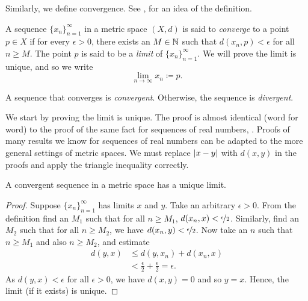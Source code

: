 Similarly, we define convergence.
See , for an idea of
the definition.

\begin{defn}
A sequence $\{ x_n \}_{n=1}^\infty$ in a metric space $(X,d)$ is said
to \emph{converge} to a point
$p \in X$ if for every $\epsilon > 0$, there exists an $M \in {\mathbb{N}}$ such
that $d(x_n,p) < \epsilon$ for all $n \geq M$.  The point $p$
is said to be a \emph{limit}
of $\{ x_n \}_{n=1}^\infty$.
We will prove the limit is unique, and so
we write
\begin{equation*}
\lim_{n\to \infty} x_n \coloneqq p .
\end{equation*}

A sequence
that converges is \emph{convergent}.
Otherwise, the sequence is 
\emph{divergent}.
\begin{myfigureht}
\caption{Sequence converging to $p$.  The first 10 points 
are shown and $M=7$ for this $\epsilon$.\label{fig:sequence-convergence-metric}}
\end{myfigureht}
\end{defn}

We start by proving the limit is unique.  The proof is almost
identical (word for word) to the proof of the same fact for sequences of
real numbers,
.
Proofs of many results we know for sequences of real numbers can be
adapted to
the more general settings of metric spaces.  We must replace $\lvert {x-y} \rvert$
with $d(x,y)$ in the proofs and apply the triangle inequality correctly.

\begin{prop} \label{prop:mslimisunique}
A convergent sequence in a metric space has a unique limit.
\end{prop}

\begin{proof}
Suppose $\{ x_n \}_{n=1}^\infty$ has limits $x$ and $y$.
Take an arbitrary $\epsilon > 0$.
From the definition find an $M_1$ such that for all $n \geq M_1$,
$d(x_n,x) < \nicefrac{\epsilon}{2}$.  Similarly, find an $M_2$
such that for all $n \geq M_2$, we have
$d(x_n,y) < \nicefrac{\epsilon}{2}$.  Now take an $n$ such that
$n \geq M_1$ and also $n \geq M_2$, and estimate
\begin{equation*}
\begin{split}
d(y,x)
& \leq
d(y,x_n) + d(x_n,x) \\
& <
\frac{\epsilon}{2} + \frac{\epsilon}{2} = \epsilon .
\end{split}
\end{equation*}
As $d(y,x) < \epsilon$ for all $\epsilon > 0$, we have $d(x,y) = 0$
and so $y=x$.  Hence, the limit (if it exists) is unique.
\end{proof}

